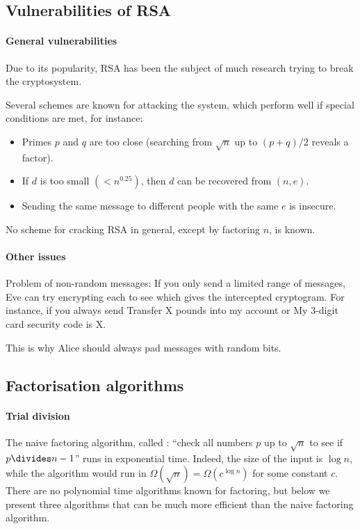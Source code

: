 \documentclass[a4paper, 11pt, openany]{book}
\begin{document}
\subsection{Vulnerabilities of RSA}

\paragraph{General vulnerabilities}

Due to its popularity, RSA has been the subject of much research trying to break the cryptosystem.

Several schemes are known for attacking the system, which perform well if special conditions are met, for instance:
\begin{itemize}
    \item Primes $p$ and $q$ are too close (searching from $\sqrt{n}$ up to $(p+q)/2$ reveals a factor).

    \item If $d$ is too small $(< n^{0.25})$, then $d$ can be recovered from $(n,e)$.

    \item Sending the same message to different people with the same $e$ is insecure.
\end{itemize}

No scheme for cracking RSA in general, except by factoring $n$, is known.


\paragraph{Other issues}
Problem of non-random messages: If you only send a limited range of messages, Eve can try encrypting each to see which gives the intercepted cryptogram. For instance, if you always send Transfer X pounds into my account or My 3-digit card security code is X.

This is why Alice should always pad messages with random bits.



\subsection{Factorisation algorithms}

\paragraph{Trial division}
The naive factoring algorithm, called : ``check all numbers $p$ up to $\sqrt{n}$ to see if $p \divides n-1$'' runs in exponential time. Indeed, the size of the input is $\log n$, while the algorithm would run in $\Omega(\sqrt{n}) = \Omega( c^{\log n} )$ for some constant $c$. There are no polynomial time algorithms known for factoring, but below we present three algorithms that can be much more efficient than the naive factoring algorithm.
\end{document}
